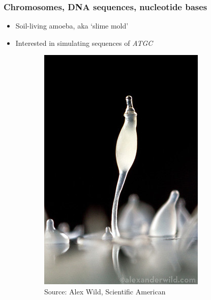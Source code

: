 \documentclass[xcolor=dvipsnames]{beamer} \usepackage{beamerthemesplit}
\begin{document}
\begin{frame}
	\frametitle{Chromosomes, DNA sequences, nucleotide bases}
	\begin{itemize}
		\item Soil-living amoeba, aka `slime mold' 
		\item Interested in simulating sequences of \emph{ATGC} 
	\end{itemize}

	\begin{figure}
	\centering
	\begin{subfigure}[b]{.22\textwidth}
	  \includegraphics[width=\textwidth]{Dictyostelium5-M.jpg}\\
	  \tiny{Source: Alex Wild, Scientific American}
	  \label{fig:orgm}
	\end{subfigure}
	\begin{subfigure}[b]{.74\textwidth}

\end{subfigure}
\end{figure}
\end{frame}
\end{document}
